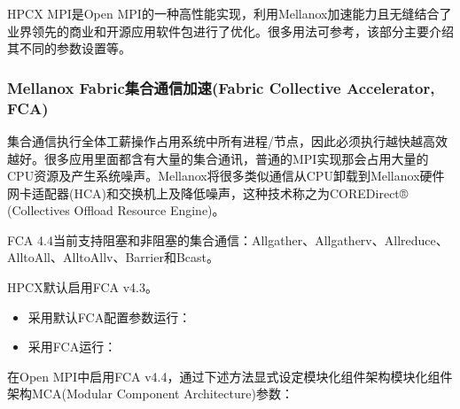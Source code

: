 \documentclass[a4paper,12pt,english]{sphinxmanual}
\begin{document}
\sphinxAtStartPar
HPC\sphinxhyphen{}X MPI是Open MPI的一种高性能实现，利用Mellanox加速能力且无缝结合了业界领先的商业和开源应用软件包进行了优化。很多用法可参考，该部分主要介绍其不同的参数设置等。


\subsubsection{Mellanox Fabric集合通信加速(Fabric Collective Accelerator, FCA)}
\label{\detokenize{mpi-application/mpi-application:mellanox-fabric-fabric-collective-accelerator-fca}}
\sphinxAtStartPar
集合通信执行全体工薪操作占用系统中所有进程/节点，因此必须执行越快越高效越好。很多应用里面都含有大量的集合通讯，普通的MPI实现那会占用大量的CPU资源及产生系统噪声。Mellanox将很多类似通信从CPU卸载到Mellanox硬件网卡适配器(HCA)和交换机上及降低噪声，这种技术称之为CORE\sphinxhyphen{}Direct® (Collectives Offload Resource Engine)。

\sphinxAtStartPar
FCA 4.4当前支持阻塞和非阻塞的集合通信：Allgather、Allgatherv、Allreduce、AlltoAll、AlltoAllv、Barrier和Bcast。

\sphinxAtStartPar
{}

\sphinxAtStartPar
HPC\sphinxhyphen{}X默认启用FCA v4.3。
\begin{itemize}
\item {} 
\sphinxAtStartPar
采用默认FCA配置参数运行：

\sphinxAtStartPar
{}

\item {} 
\sphinxAtStartPar
采用FCA运行：

\sphinxAtStartPar
{}

\end{itemize}

\sphinxAtStartPar
{}

\sphinxAtStartPar
在Open MPI中启用FCA v4.4，通过下述方法显式设定模块化组件架构模块化组件架构MCA(Modular Component Architecture)参数：

\sphinxAtStartPar
{}
\end{document}
